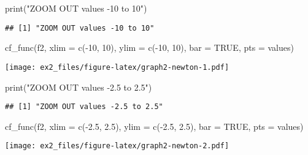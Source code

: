 \documentclass[
]{article}
\newenvironment{Shaded}{\begin{snugshade}}{\end{snugshade}}
\newcommand{\AttributeTok}[1]{\textcolor[rgb]{0.77,0.63,0.00}{#1}}
\newcommand{\ConstantTok}[1]{\textcolor[rgb]{0.00,0.00,0.00}{#1}}
\newcommand{\DecValTok}[1]{\textcolor[rgb]{0.00,0.00,0.81}{#1}}
\newcommand{\FloatTok}[1]{\textcolor[rgb]{0.00,0.00,0.81}{#1}}
\newcommand{\FunctionTok}[1]{\textcolor[rgb]{0.00,0.00,0.00}{#1}}
\newcommand{\NormalTok}[1]{#1}
\newcommand{\SpecialCharTok}[1]{\textcolor[rgb]{0.00,0.00,0.00}{#1}}
\newcommand{\StringTok}[1]{\textcolor[rgb]{0.31,0.60,0.02}{#1}}
\begin{document}
\begin{Shaded}
\begin{Highlighting}[]
\FunctionTok{print}\NormalTok{(}\StringTok{"ZOOM OUT values {-}10 to 10"}\NormalTok{)}
\end{Highlighting}
\end{Shaded}

\begin{verbatim}
## [1] "ZOOM OUT values -10 to 10"
\end{verbatim}

\begin{Shaded}
\begin{Highlighting}[]
\FunctionTok{cf\_func}\NormalTok{(f2, }\AttributeTok{xlim =} \FunctionTok{c}\NormalTok{(}\SpecialCharTok{{-}}\DecValTok{10}\NormalTok{, }\DecValTok{10}\NormalTok{), }\AttributeTok{ylim =} \FunctionTok{c}\NormalTok{(}\SpecialCharTok{{-}}\DecValTok{10}\NormalTok{, }\DecValTok{10}\NormalTok{), }\AttributeTok{bar =} \ConstantTok{TRUE}\NormalTok{, }\AttributeTok{pts =}\NormalTok{ values)}
\end{Highlighting}
\end{Shaded}

\texttt{[image: ex2\_files/figure-latex/graph2-newton-1.pdf]}

\begin{Shaded}
\begin{Highlighting}[]
\FunctionTok{print}\NormalTok{(}\StringTok{"ZOOM OUT values {-}2.5 to 2.5"}\NormalTok{)}
\end{Highlighting}
\end{Shaded}

\begin{verbatim}
## [1] "ZOOM OUT values -2.5 to 2.5"
\end{verbatim}

\begin{Shaded}
\begin{Highlighting}[]
\FunctionTok{cf\_func}\NormalTok{(f2, }\AttributeTok{xlim =} \FunctionTok{c}\NormalTok{(}\SpecialCharTok{{-}}\FloatTok{2.5}\NormalTok{, }\FloatTok{2.5}\NormalTok{), }\AttributeTok{ylim =} \FunctionTok{c}\NormalTok{(}\SpecialCharTok{{-}}\FloatTok{2.5}\NormalTok{, }\FloatTok{2.5}\NormalTok{), }\AttributeTok{bar =} \ConstantTok{TRUE}\NormalTok{, }\AttributeTok{pts =}\NormalTok{ values)}
\end{Highlighting}
\end{Shaded}

\texttt{[image: ex2\_files/figure-latex/graph2-newton-2.pdf]}
\end{document}
